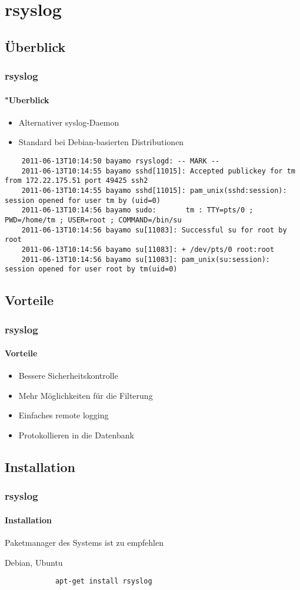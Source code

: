 \section{rsyslog}
\subsection{Überblick}
\begin{frame}[fragile]
	\frametitle{rsyslog}
	\framesubtitle{"Uberblick}
	\begin{itemize}
		\item Alternativer syslog-Daemon
		\item Standard bei Debian-basierten Distributionen
	\end{itemize}
	\begin{center}
		\begin{tiny}
			\begin{verbatim}
	2011-06-13T10:14:50 bayamo rsyslogd: -- MARK --
	2011-06-13T10:14:55 bayamo sshd[11015]: Accepted publickey for tm from 172.22.175.51 port 49425 ssh2
	2011-06-13T10:14:55 bayamo sshd[11015]: pam_unix(sshd:session): session opened for user tm by (uid=0)
	2011-06-13T10:14:56 bayamo sudo:       tm : TTY=pts/0 ; PWD=/home/tm ; USER=root ; COMMAND=/bin/su
	2011-06-13T10:14:56 bayamo su[11083]: Successful su for root by root
	2011-06-13T10:14:56 bayamo su[11083]: + /dev/pts/0 root:root
	2011-06-13T10:14:56 bayamo su[11083]: pam_unix(su:session): session opened for user root by tm(uid=0)
			\end{verbatim}
		\end{tiny}
	\end{center}
\end{frame}

\subsection{Vorteile}
\begin{frame}
	\frametitle{rsyslog}
	\framesubtitle{Vorteile}
	\begin{itemize}
		\item Bessere Sicherheitskontrolle
		\item Mehr Möglichkeiten für die Filterung
		\item Einfaches remote logging
		\item Protokollieren in die Datenbank
	\end{itemize}
\end{frame}

\subsection{Installation}
\begin{frame}[fragile]
	\frametitle{rsyslog}
	\framesubtitle{Installation}
	Paketmanager des Systems ist zu empfehlen
	\bigskip
	\begin{block}{Debian, Ubuntu}
		\begin{verbatim}
			apt-get install rsyslog
		\end{verbatim}
	\end{block}
\end{frame}

